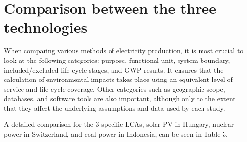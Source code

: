 \documentclass[9pt]{extarticle}
\begin{document}
\newpage
\section{Comparison between the three technologies}
When comparing various methods of electricity production, it is most crucial to look at
the following categories: purpose, functional unit, system boundary, included/excluded
life cycle stages, and GWP results. It ensures that the calculation of environmental
impacts takes place using an equivalent level of service and life cycle coverage. Other
categories such as geographic scope, databases, and software tools are also important,
although only to the extent that they affect the underlying assumptions and data used
by each study.

A detailed comparison for the 3 specific LCAs, solar PV in Hungary, nuclear power in
Switzerland, and coal power in Indonesia, can be seen in Table 3.
\end{document}
